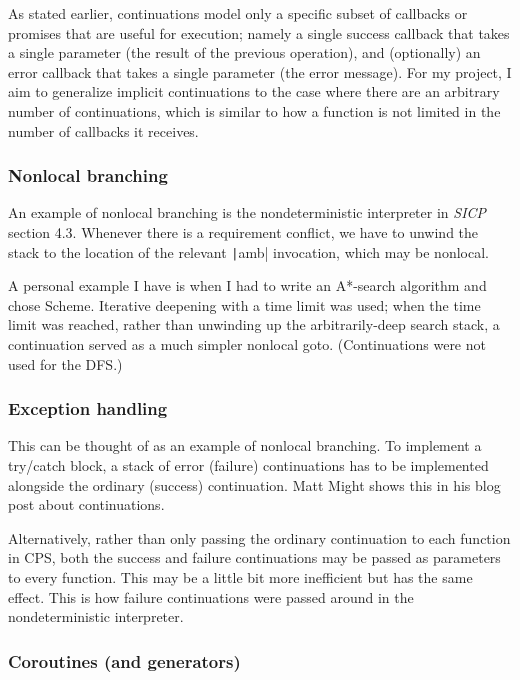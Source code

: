 \documentclass[]{article}
\begin{document}
As stated earlier, continuations model only a specific subset of callbacks or promises that are useful for execution; namely a single success callback that takes a single parameter (the result of the previous operation), and (optionally) an error callback that takes a single parameter (the error message). For my project, I aim to generalize implicit continuations to the case where there are an arbitrary number of continuations, which is similar to how a function is not limited in the number of callbacks it receives.

\subsubsection{Nonlocal branching}
\label{sec:nonl}

An example of nonlocal branching is the nondeterministic interpreter in \textit{SICP} section 4.3. Whenever there is a requirement conflict, we have to unwind the stack to the location of the relevant \texttt|amb| invocation, which may be nonlocal.

A personal example I have is when I had to write an A*-search algorithm and chose Scheme. Iterative deepening with a time limit was used; when the time limit was reached, rather than unwinding up the arbitrarily-deep search stack, a continuation served as a much simpler nonlocal goto. (Continuations were not used for the DFS.)

\subsubsection{Exception handling}
\label{sec:excp}

This can be thought of as an example of nonlocal branching. To implement a try/catch block, a stack of error (failure) continuations has to be implemented alongside the ordinary (success) continuation. Matt Might shows this in his blog post about continuations.

Alternatively, rather than only passing the ordinary continuation to each function in CPS, both the success and failure continuations may be passed as parameters to every function. This may be a little bit more inefficient but has the same effect. This is how failure continuations were passed around in the nondeterministic interpreter.

\subsubsection{Coroutines (and generators)}
\label{sec:coro}
\end{document}
